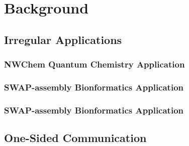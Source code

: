 \chapter{Background}



\section{Irregular Applications}

\subsection{NWChem Quantum Chemistry Application }
\subsection{SWAP-assembly Bionformatics Application}
\subsection{SWAP-assembly Bionformatics Application}


\section{One-Sided Communication}
